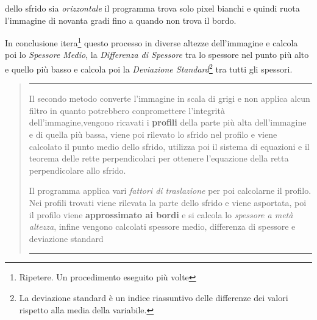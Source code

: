 \documentclass[a4paper, notitlepage, 12pt]{article}
\begin{document}
    dello sfrido sia \emph{orizzontale} il programma trova solo pixel bianchi e quindi ruota l'immagine di novanta gradi fino a quando
    non trova il bordo.\par
    \pagebreak
    \noindent In conclusione itera\footnote[7]{\indent Ripetere. Un procedimento eseguito più volte} questo processo in diverse altezze dell'immagine e calcola poi lo \emph{Spessore Medio}, la \emph{Differenza di Spessore} tra 
    lo spessore nel punto più alto e quello più basso e calcola poi la \emph{Deviazione Standard}\footnote[8]{\indent La deviazione standard è un indice riassuntivo delle differenze dei valori rispetto alla media della variabile.} tra tutti gli spessori.
    \begin{abstract}
        \noindent \rule{\linewidth}{.6pt}\par
        \noindent Il secondo metodo converte l'immagine in scala di grigi e non applica alcun filtro in quanto potrebbero
        conpromettere l'integrità dell'immagine,vengono ricavati i \textbf{profili} della parte più alta dell'immagine e di quella più bassa,
        viene poi rilevato lo sfrido nel profilo e viene calcolato il punto medio dello sfrido, utilizza poi il sistema di equazioni e  il teorema delle rette perpendicolari per ottenere 
        l'equazione della retta perpendicolare allo sfrido.
        \par \noindent Il programma applica vari \emph{fattori di traslazione} per poi calcolarne il profilo.
        Nei profili trovati viene rilevata la parte dello sfrido e viene asportata, poi il profilo viene \textbf{approssimato ai bordi} e si calcola
        lo \emph{spessore a metà altezza}, infine vengono calcolati spessore medio, differenza di spessore e deviazione standard
        \par
        \noindent \rule{\linewidth}{.6pt} 
    \end{abstract}
    \thispagestyle{plain} 
\end{document}
